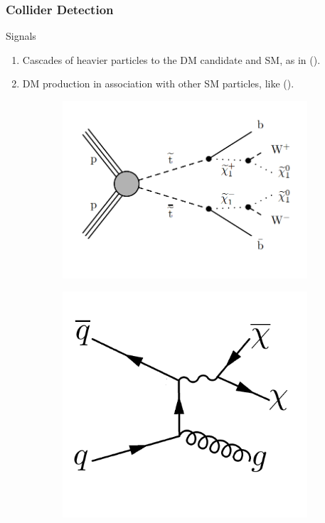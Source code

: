 \documentclass{beamer}
\begin{document}
\begin{frame}
\frametitle{Collider Detection}

\begin{alertblock}{Signals}
	\begin{enumerate}
		\item Cascades of heavier particles to the DM candidate and SM, as in ().
		\item DM production in association with other SM particles,	like ().
	\end{enumerate}
\end{alertblock}

\begin{figure}[!h]
	
	\begin{subfigure}[b]{0.44\textwidth}
		\centering
		\includegraphics[width=\textwidth]{pictures/Cascade}
		\caption{}
		\label{Cascade}
	\end{subfigure}
	\begin{subfigure}[b]{0.44\textwidth}
		\centering
		\includegraphics[scale=0.3]{pictures/DirectProduction}
		\caption{}
		\label{DirectProduction}
	\end{subfigure}


\end{figure}
\end{frame}
\end{document}
